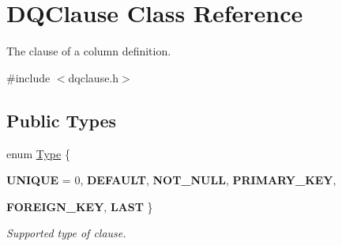 \hypertarget{classDQClause}{
\section{DQClause Class Reference}
\label{classDQClause}
}


The clause of a column definition.  




{\ttfamily \#include $<$dqclause.h$>$}

\subsection*{Public Types}
\begin{DoxyCompactItemize}
\item 
enum \hyperlink{classDQClause_a8cbc814ce3412035fbaa066b20689fe3}{Type} \{ \par
{\bfseries UNIQUE} =  0, 
{\bfseries DEFAULT}, 
{\bfseries NOT\_\-NULL}, 
{\bfseries PRIMARY\_\-KEY}, 
\par
{\bfseries FOREIGN\_\-KEY}, 
{\bfseries LAST}
 \}
\begin{DoxyCompactList}\small\item\em Supported type of clause. \item\end{DoxyCompactList}\end{DoxyCompactItemize}
